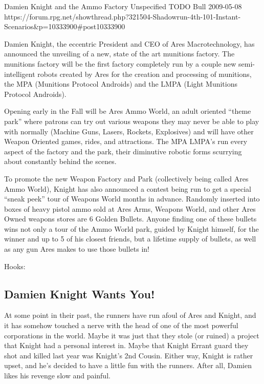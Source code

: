 \begin{scenario}{Damien Knight and the Ammo Factory}
	{Unspecified}
	{TODO}
	{Bull}
	{2009-05-08}
	{https://forum.rpg.net/showthread.php?321504-Shadowrun-4th-101-Instant-Scenarios\&p=10333900\#post10333900}

Damien Knight, the eccentric President and CEO of Ares Macrotechnology, has announced the unveiling of a new, state of the art munitions factory. The munitions factory will be the first factory completely run by a couple new semi-intelligent robots created by Ares for the creation and processing of munitions, the MPA (Munitions Protocol Androids) and the LMPA (Light Munitions Protocol Androids).

Opening early in the Fall will be Ares Ammo World, an adult oriented ``theme park'' where patrons can try out various weapons they may never be able to play with normally (Machine Guns, Lasers, Rockets, Explosives) and will have other Weapon Oriented games, rides, and attractions. The MPA LMPA's run every aspect of the factory and the park, their diminutive robotic forms scurrying about constantly behind the scenes.

To promote the new Weapon Factory and Park (collectively being called Ares Ammo World), Knight has also announced a contest being run to get a special ``sneak peek'' tour of Weapons World months in advance. Randomly inserted into boxes of heavy pistol ammo sold at Ares Arms, Weapons World, and other Ares Owned weapons stores are 6 Golden Bullets. Anyone finding one of these bullets wins not only a tour of the Ammo World park, guided by Knight himself, for the winner and up to 5 of his closest friends, but a lifetime supply of bullets, as well as any gun Ares makes to use those bullets in!

Hooks:

\subsection{Damien Knight Wants You!}

At some point in their past, the runners have run afoul of Ares and Knight, and it has somehow touched a nerve with the head of one of the most powerful corporations in the world. Maybe it was just that they stole (or ruined) a project that Knight had a personal interest in. Maybe that Knight Errant guard they shot and killed last year was Knight's 2nd Cousin. Either way, Knight is rather upset, and he's decided to have a little fun with the runners. After all, Damien likes his revenge slow and painful.


\end{scenario}
